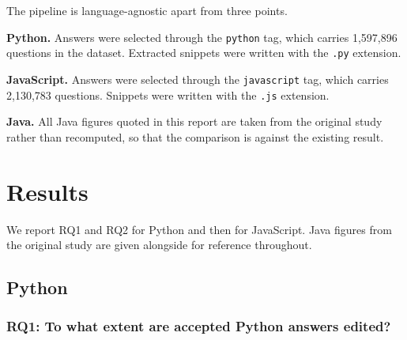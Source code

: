 \documentclass[onecolumn,11pt]{IEEEtran}
\begin{document}
The pipeline is language-agnostic apart from three points.

\textbf{Python.}
Answers were selected through the \texttt{python} tag, which carries 1{,}597{,}896 questions in the dataset.
Extracted snippets were written with the \texttt{.py} extension.

\textbf{JavaScript.}
Answers were selected through the \texttt{javascript} tag, which carries 2{,}130{,}783 questions.
Snippets were written with the \texttt{.js} extension.

\textbf{Java.}
All Java figures quoted in this report are taken from the original study~\cite{wiratsin2025java} rather than recomputed, so that the comparison is against the existing result.

\section{Results}

We report RQ1 and RQ2 for Python and then for JavaScript.
Java figures from the original study are given alongside for reference throughout.

\subsection{Python}
\label{sec:results-python}

\subsubsection{RQ1: To what extent are accepted Python answers edited?}
\end{document}
